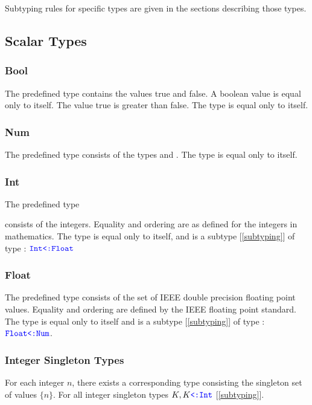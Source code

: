 \documentclass{article}
\begin{document}
{Subtyping rules for specific types are given in the sections describing those types.


\subsection{Scalar Types}
\label{scalarTypes}

\subsubsection{Bool}
\label{bool}

The predefined type \BOOL{} contains the values true and false.  A boolean value is equal only to itself. The value true is greater than false. The type \BOOL{} is equal only to itself.

\subsubsection{Num}
\label{number}

 The predefined type \NUM{} consists of the types \INT{} and \FLOAT. The type \NUM{} is equal only to itself.
 
\subsubsection{Int}
\label{int}

The predefined type \INT} consists of the integers. Equality and ordering are as defined for the integers in mathematics. The type \INT{} is equal only to itself, and is a subtype  [\ref{subtyping}] of type \FLOAT{}:  $\texttt{\color{blue} Int} \texttt{\color{blue} \tt<:}{} \texttt{\color{blue} Float}$


\subsubsection{Float}
\label{float}

The predefined type \FLOAT{} consists of the set of IEEE double precision floating point values.  Equality and ordering are defined by the IEEE floating point standard.  The type \FLOAT{} is equal only to itself and is a subtype [\ref{subtyping}] of type \NUM{}: $\texttt{\color{blue} Float} \texttt{\color{blue} \tt<:}{} \texttt{\color{blue} Num}$.
 
\subsubsection{Integer Singleton Types}
\label{integerSingletonTypes}

For each integer $n$, there exists a corresponding type consisting the singleton set of values $\{n\}$. For all  integer singleton types $K, K \texttt{\color{blue} \tt<:}{} \texttt{\color{blue} Int}$  [\ref{subtyping}].
\end{document}
